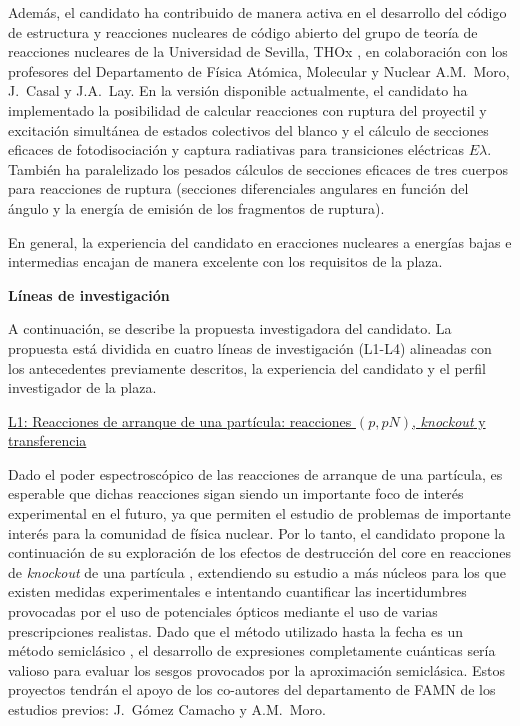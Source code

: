 \documentclass[a4paper,12pt,twoside]{article}
\begin{document}
Además, el candidato ha contribuido de manera activa en el desarrollo del código de estructura y reacciones nucleares de código abierto del grupo de teoría de reacciones nucleares de la Universidad de Sevilla, THOx \cite{thox}, en colaboración con los profesores del Departamento de Física Atómica, Molecular y Nuclear A.M.~Moro, J.~Casal y J.A.~Lay. En la versión disponible actualmente, el candidato ha implementado la posibilidad de calcular reacciones con ruptura del proyectil y excitación simultánea de estados colectivos del blanco \cite{target_exc} y el cálculo de secciones eficaces de fotodisociación y captura radiativas para transiciones eléctricas $E\lambda$. También ha paralelizado los pesados cálculos de secciones eficaces de tres cuerpos para reacciones de ruptura (secciones diferenciales angulares en función del ángulo y la energía de emisión de los fragmentos de ruptura).

En general, la experiencia del candidato en eracciones nucleares a energías bajas e intermedias encajan de manera excelente con los requisitos de la plaza.

\textbf{Líneas de investigación}

A continuación, se describe la propuesta investigadora del candidato. La propuesta
está dividida en cuatro líneas de investigación (L1-L4) alineadas con los antecedentes previamente descritos, la experiencia del candidato y el perfil investigador de la plaza.

\underline{L1: Reacciones de arranque de una partícula: reacciones $(p,pN)$, \textit{knockout} y transferencia}

Dado el poder espectroscópico de las reacciones de arranque de una partícula, es esperable que dichas reacciones sigan siendo un importante foco de interés experimental en el futuro, ya que permiten el estudio de problemas de importante interés para la comunidad de física nuclear. Por lo tanto, el candidato propone la continuación de su exploración de los efectos de destrucción del core en reacciones de \textit{knockout} de una partícula \cite{quenching}, extendiendo su estudio a más núcleos para los que existen medidas experimentales \cite{Tos21} e intentando cuantificar las incertidumbres provocadas por el uso de potenciales ópticos mediante el uso de varias prescripciones realistas. Dado que el método utilizado hasta la fecha es un método semiclásico \cite{quenching}, el desarrollo de expresiones completamente cuánticas sería valioso para evaluar los sesgos provocados por la aproximación semiclásica. Estos proyectos tendrán el apoyo de los co-autores del departamento de FAMN de los estudios previos: J.~Gómez Camacho y A.M.~Moro.
\end{document}
